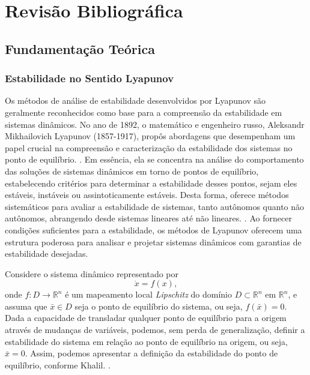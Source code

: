 \chapter{Revisão Bibliográfica} \label{cap2}

\section{Fundamentação Teórica}

\subsection{Estabilidade no Sentido Lyapunov}

Os métodos de análise de estabilidade desenvolvidos por Lyapunov são geralmente reconhecidos como base para a compreensão da estabilidade em sistemas dinâmicos. No ano de 1892, o matemático e engenheiro russo, Aleksandr Mikhailovich Lyapunov (1857-1917), propôs abordagens que desempenham um papel crucial na compreensão e caracterização da estabilidade dos sistemas no ponto de equilíbrio. \citep{lyapunov1892}. Em essência, ela se concentra na análise do comportamento das soluções de sistemas dinâmicos em torno de pontos de equilíbrio, estabelecendo critérios para determinar a estabilidade desses pontos, sejam eles estáveis, instáveis ou assintoticamente estáveis. Desta forma, oferece métodos sistemáticos para avaliar a estabilidade de sistemas, tanto autônomos quanto não autônomos, abrangendo desde sistemas lineares até não lineares. \cite{khalil2002}. Ao fornecer condições suficientes para a estabilidade, os métodos de Lyapunov oferecem uma estrutura poderosa para analisar e projetar sistemas dinâmicos com garantias de estabilidade desejadas.

Considere o sistema dinâmico representado por \begin{equation}\dot{x} = f(x), \end{equation} onde $f: D \rightarrow \mathbb{R}^n$ é um mapeamento local \textit{Lipschitz} do domínio $D \subset \mathbb{R}^n$ em $\mathbb{R}^n$, e assuma que $\bar{x} \in D$ seja o ponto de equilíbrio do sistema, ou seja, $f(\bar{x}) = 0$. Dada a capacidade de transladar qualquer ponto de equilíbrio para a origem através de mudanças de variáveis, podemos, sem perda de generalização, definir a estabilidade do sistema em relação ao ponto de equilíbrio na origem, ou seja, $\bar{x} = 0$. Assim, podemos apresentar a definição da estabilidade do ponto de equilíbrio, conforme Khalil. \cite{khalil2002}.

